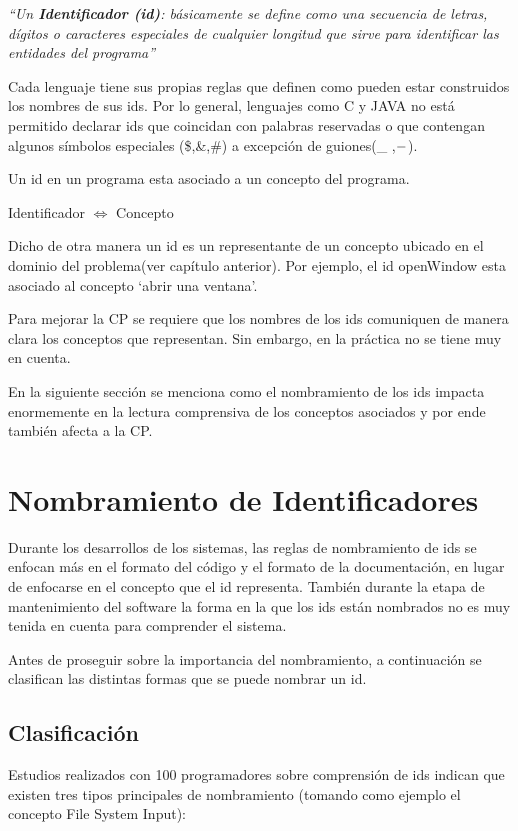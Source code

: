 \documentclass[a4paper,12pt]{report}
\begin{document}
\textit{“Un \textbf{Identificador (id)}: básicamente se define como una secuencia de letras, dígitos o caracteres especiales de cualquier longitud que sirve para identificar las entidades del programa”}
 
Cada lenguaje tiene sus propias reglas que definen como pueden estar construidos los nombres de sus ids. Por lo general, lenguajes como C y JAVA no está permitido declarar ids que coincidan con palabras reservadas o que contengan algunos símbolos especiales (\$,\&,\#) a excepción de guiones(\_ ,$\--$).

Un id en un programa esta asociado a un concepto del programa. 

\begin{center}
\textsf{Identificador $\Leftrightarrow$ Concepto}
\end{center}

Dicho de otra manera un id es un representante de un concepto ubicado en el dominio del problema\cite{DFPM05,DMDJ13}(ver capítulo anterior). Por ejemplo, el id \textsf{openWindow} esta asociado al concepto `abrir una ventana'.

Para mejorar la CP se requiere que los nombres de los ids comuniquen de manera clara los conceptos que representan\cite{DFPM05,DLHD06,DCHD06}. Sin embargo, en la práctica no se tiene muy en cuenta. 

En la siguiente sección se menciona como el nombramiento de los ids impacta enormemente en la lectura comprensiva de los conceptos asociados y por ende también afecta a la CP.

\pagebreak
\section{Nombramiento de Identificadores}

Durante los desarrollos de los sistemas, las reglas de nombramiento de ids se enfocan más en el formato del código y el formato de la documentación, en lugar de enfocarse en el concepto que el id representa. También durante la etapa de mantenimiento del software la forma en la que los ids están nombrados no es muy tenida en cuenta para comprender el sistema. 

Antes de proseguir sobre la importancia del nombramiento, a continuación se clasifican las distintas formas que se puede nombrar un id.

\subsection{Clasificación}
Estudios realizados con 100 programadores\cite{DCHD06} sobre comprensión de ids indican que existen tres tipos principales de nombramiento (tomando como ejemplo el concepto \textsf{File System Input}): 
\end{document}
